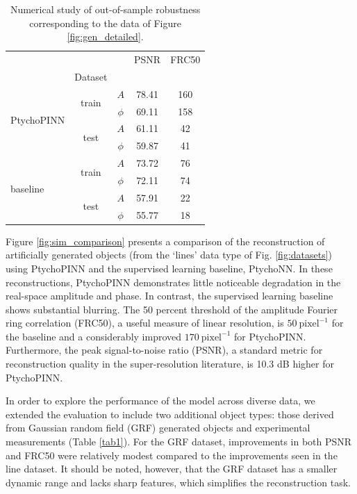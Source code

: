 \documentclass[sn-mathphys]{sn-jnl}%
\theoremstyle{thmstyleone}%
\theoremstyle{thmstyletwo}%
\theoremstyle{thmstylethree}%
\begin{document}
\begin{table}[h]
\begin{center}
\caption{Numerical study of out-of-sample robustness corresponding to the data of Figure \ref{fig:gen_detailed}.}\label{tab2}%
\begin{tabular}{lcccc}
\toprule
           &      &      &  PSNR &  FRC50 \\
& Dataset & &       &        \\
\midrule
\multirow{4}{*}{PtychoPINN} & \multirow{2}{*}{train} & $A$ & 78.41 & 160 \\
           &      & $\phi$ & 69.11 & 158 \\
\cline{2-5}
           & \multirow{2}{*}{test} & $A$ & 61.11 &  42 \\
           &      & $\phi$ & 59.87 &  41 \\
\cline{1-5}
\cline{2-5}
\multirow{4}{*}{baseline} & \multirow{2}{*}{train} & $A$ & 73.72 &  76 \\
           &      & $\phi$ & 72.11 &  74 \\
\cline{2-5}
           & \multirow{2}{*}{test} & $A$ & 57.91 &  22 \\
           &      & $\phi$ & 55.77 &  18 \\
\bottomrule
\end{tabular}
\end{center}
\end{table}

Figure \ref{fig:sim_comparison} presents a comparison of the reconstruction of artificially generated objects (from the `lines' data type of Fig. \ref{fig:datasets}) using PtychoPINN and the supervised learning baseline, PtychoNN. In these reconstructions, PtychoPINN demonstrates little noticeable degradation in the real-space amplitude and phase. In contrast, the supervised learning baseline shows substantial blurring. The 50 percent threshold of the amplitude Fourier ring correlation (FRC50), a useful measure of linear resolution, is $50~\mathrm{pixel}^{-1}$ for the baseline and a considerably improved $170~\mathrm{pixel}^{-1}$ for PtychoPINN. Furthermore, the peak signal-to-noise ratio (PSNR), a standard metric for reconstruction quality in the super-resolution literature, is 10.3 dB higher for PtychoPINN. 

In order to explore the performance of the model across diverse data, we extended the evaluation to include two additional object types: those derived from Gaussian random field (GRF) generated objects and experimental measurements (Table \ref{tab1}). For the GRF dataset, improvements in both PSNR and FRC50 were relatively modest compared to the improvements seen in the line dataset. It should be noted, however, that the GRF dataset has a smaller dynamic range and lacks sharp features, which simplifies the reconstruction task.
\end{document}
